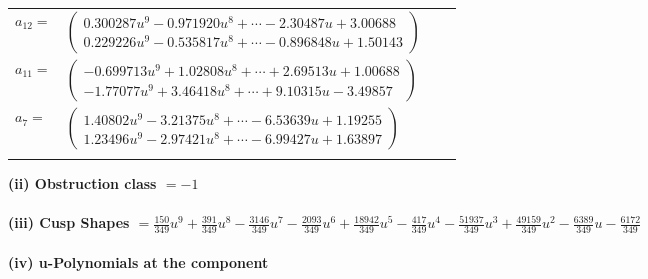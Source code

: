 \documentclass[1p]{elsarticle_modified}
\theoremstyle{definition}
\begin{document}
\begin{tabular}{m{7pt} m{180pt} m{7pt} m{180pt} }
\flushright $a_{12}=$&$\begin{pmatrix}0.300287 u^{9}-0.971920 u^{8}+\cdots-2.30487 u+3.00688\\0.229226 u^{9}-0.535817 u^{8}+\cdots-0.896848 u+1.50143\end{pmatrix}$ \\
\flushright $a_{11}=$&$\begin{pmatrix}-0.699713 u^{9}+1.02808 u^{8}+\cdots+2.69513 u+1.00688\\-1.77077 u^{9}+3.46418 u^{8}+\cdots+9.10315 u-3.49857\end{pmatrix}$ \\
\flushright $a_{7}=$&$\begin{pmatrix}1.40802 u^{9}-3.21375 u^{8}+\cdots-6.53639 u+1.19255\\1.23496 u^{9}-2.97421 u^{8}+\cdots-6.99427 u+1.63897\end{pmatrix}$\\&\end{tabular}
\flushleft \textbf{(ii) Obstruction class $= -1$}\\~\\
\flushleft \textbf{(iii) Cusp Shapes $= \frac{150}{349} u^9+\frac{391}{349} u^8-\frac{3146}{349} u^7-\frac{2093}{349} u^6+\frac{18942}{349} u^5-\frac{417}{349} u^4-\frac{51937}{349} u^3+\frac{49159}{349} u^2-\frac{6389}{349} u-\frac{6172}{349}$}\\~\\
\newpage\renewcommand{\arraystretch}{1}
\flushleft \textbf{(iv) u-Polynomials at the component}\newline \\
\end{document}
